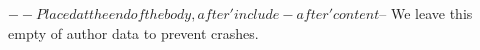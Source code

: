 $-- Placed at the end of the body, after 'include-after' content
$-- We leave this empty of author data to prevent crashes.
